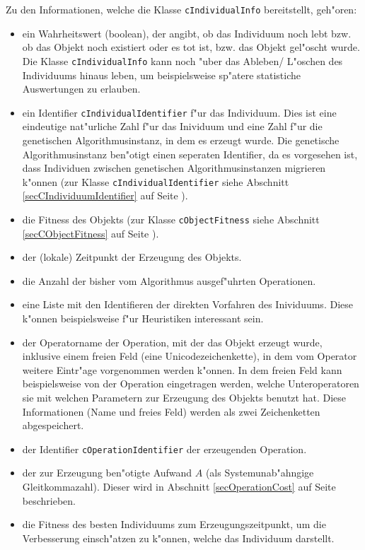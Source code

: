 \bigskip\noindent
Zu den Informationen, welche die Klasse \verb|cIndividualInfo| bereitstellt, geh"oren:
\begin{itemize}
 \item ein Wahrheitswert (boolean), der angibt, ob das Individuum noch lebt bzw. ob das Objekt noch existiert oder es tot ist, bzw. das Objekt gel"oscht wurde. Die Klasse \verb|cIndividualInfo| kann noch "uber das Ableben/ L"oschen des Individuums hinaus leben, um beispielsweise sp"atere statistiche Auswertungen zu erlauben.
 \item ein Identifier \verb|cIndividualIdentifier| f"ur das Individuum. Dies ist eine eindeutige nat"urliche Zahl f"ur das Inividuum und eine Zahl f"ur die genetischen Algorithmusinstanz, in dem es erzeugt wurde. Die genetische Algorithmusinstanz ben"otigt einen seperaten Identifier, da es vorgesehen ist, dass Individuen zwischen genetischen Algorithmusinstanzen migrieren k"onnen (zur Klasse \verb|cIndividualIdentifier| siehe Abschnitt \ref{secCIndividuumIdentifier} auf Seite \pageref{secCIndividuumIdentifier}).
 \item die Fitness des Objekts (zur Klasse \verb|cObjectFitness| siehe Abschnitt \ref{secCObjectFitness} auf Seite \pageref{secCObjectFitness}).
 \item der (lokale) Zeitpunkt der Erzeugung des Objekts.
 \item die Anzahl der bisher vom Algorithmus ausgef"uhrten Operationen.
 \item eine Liste mit den Identifieren der direkten Vorfahren des Inividuums. Diese k"onnen beispielsweise f"ur Heuristiken interessant sein.
 \item der Operatorname der Operation, mit der das Objekt erzeugt wurde, inklusive einem freien Feld (eine Unicodezeichenkette), in dem vom Operator weitere Eintr"age vorgenommen werden k"onnen. In dem freien Feld kann beispielsweise von der Operation eingetragen werden, welche Unteroperatoren sie mit welchen Parametern zur Erzeugung des Objekts benutzt hat. Diese Informationen (Name und freies Feld) werden als zwei Zeichenketten abgespeichert.
 \item der Identifier \verb|cOperationIdentifier| der erzeugenden Operation.
 \item der zur Erzeugung ben"otigte Aufwand $A$ (als Systemunab"ahngige Gleitkommazahl). Dieser wird in Abschnitt \ref{secOperationCost} auf Seite \pageref{secOperationCost} beschrieben.
 \item die Fitness des besten Individuums zum Erzeugungszeitpunkt, um die Verbesserung einsch"atzen zu k"onnen, welche das Individuum darstellt.
\end{itemize}

